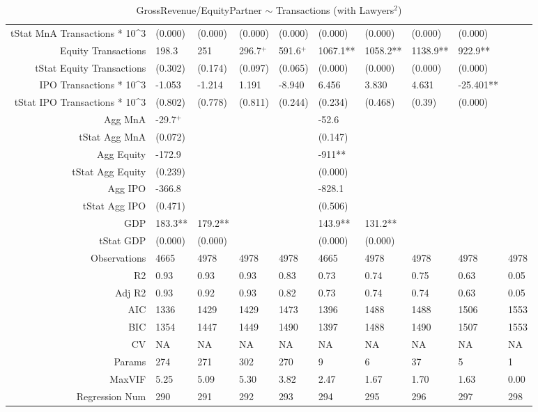 \begin{table}[ht]
\begin{tabular}{rlllllllll}
  tStat MnA Transactions * 10^3 & (0.000) & (0.000) & (0.000) & (0.000) & (0.000) & (0.000) & (0.000) & (0.000) &  \\ 
  Equity Transactions & 198.3 & 251 & 296.7$^{+}$ & 591.6$^{+}$ & 1067.1** & 1058.2** & 1138.9** & 922.9** &  \\ 
  tStat Equity Transactions & (0.302) & (0.174) & (0.097) & (0.065) & (0.000) & (0.000) & (0.000) & (0.000) &  \\ 
  IPO Transactions * 10^3 & -1.053 & -1.214 & 1.191 & -8.940 & 6.456 & 3.830 & 4.631 & -25.401** &  \\ 
  tStat IPO Transactions * 10^3 & (0.802) & (0.778) & (0.811) & (0.244) & (0.234) & (0.468) & (0.39) & (0.000) &  \\ 
  Agg MnA & -29.7$^{+}$ &  &  &  & -52.6 &  &  &  &  \\ 
  tStat Agg MnA & (0.072) &  &  &  & (0.147) &  &  &  &  \\ 
  Agg Equity & -172.9 &  &  &  & -911** &  &  &  &  \\ 
  tStat Agg Equity & (0.239) &  &  &  & (0.000) &  &  &  &  \\ 
  Agg IPO & -366.8 &  &  &  & -828.1 &  &  &  &  \\ 
  tStat Agg IPO & (0.471) &  &  &  & (0.506) &  &  &  &  \\ 
  GDP & 183.3** & 179.2** &  &  & 143.9** & 131.2** &  &  &  \\ 
  tStat GDP & (0.000) & (0.000) &  &  & (0.000) & (0.000) &  &  &  \\ 
  Observations & 4665 & 4978 & 4978 & 4978 & 4665 & 4978 & 4978 & 4978 & 4978 \\ 
  R2 & 0.93 & 0.93 & 0.93 & 0.83 & 0.73 & 0.74 & 0.75 & 0.63 & 0.05 \\ 
  Adj R2 & 0.93 & 0.92 & 0.93 & 0.82 & 0.73 & 0.74 & 0.74 & 0.63 & 0.05 \\ 
  AIC & 1336 & 1429 & 1429 & 1473 & 1396 & 1488 & 1488 & 1506 & 1553 \\ 
  BIC & 1354 & 1447 & 1449 & 1490 & 1397 & 1488 & 1490 & 1507 & 1553 \\ 
  CV & NA & NA & NA & NA & NA & NA & NA & NA & NA \\ 
  Params & 274 & 271 & 302 & 270 & 9 & 6 & 37 & 5 & 1 \\ 
  MaxVIF & 5.25 & 5.09 & 5.30 & 3.82 & 2.47 & 1.67 & 1.70 & 1.63 & 0.00 \\ 
  Regression Num & 290 & 291 & 292 & 293 & 294 & 295 & 296 & 297 & 298 \\ 
   \hline
\end{tabular}
\caption{GrossRevenue/EquityPartner $\sim$ Transactions (with Lawyers$^2$)} 
\end{table}
